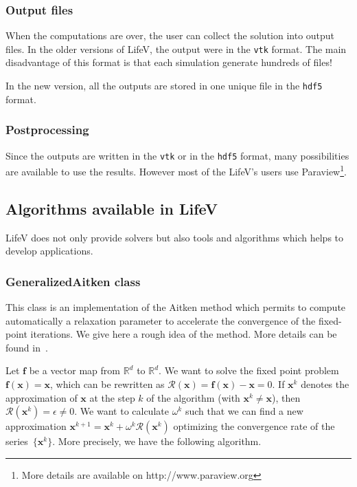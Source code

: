 \documentclass[11pt]{article}
\begin{document}
\subsubsection{Output files}
When the computations are over, the user can collect the solution into output files. In the older versions of LifeV, the output were in the \texttt{vtk} format. The main disadvantage of this format is that each simulation generate hundreds of files!

In the new version, all the outputs are stored in one unique file in the \texttt{hdf5} format.

\subsubsection{Postprocessing}
Since the outputs are written in the \texttt{vtk} or in the \texttt{hdf5} format, many possibilities are available to use the results. However most of the LifeV's users use Paraview\footnote{More details are available on http://www.paraview.org}.

\subsection{Algorithms available in LifeV}
LifeV does not only provide solvers but also tools and algorithms which helps to develop applications.

\subsubsection{GeneralizedAitken class}
\label{sec:aitken}
This class is an implementation of the Aitken method which permits to compute automatically a relaxation parameter to accelerate the convergence of the fixed-point iterations. We give here a rough idea of the method. More details can be found in~\cite{deparis}.

Let $\mathbf{f}$ be a vector map from $\mathbb{R}^d$ to $\mathbb{R}^d$. We want to solve the fixed point problem $\mathbf{f}(\mathbf{x})=\mathbf{x}$, which can be rewritten as $\mathcal{R}(\mathbf{x})=\mathbf{f}(\mathbf{x})-\mathbf{x} = 0$. If $\mathbf{x}^k$ denotes the approximation of $\mathbf{x}$ at the step $k$ of the algorithm (with $\mathbf{x}^k\neq\mathbf{x}$), then $\mathcal{R}(\mathbf{x}^k)=\epsilon\neq0$. We want to calculate $\omega^k$ such that we can find a new approximation $\mathbf{x}^{k+1}=\mathbf{x}^k+\omega^k\mathcal{R}(\mathbf{x}^k)$ optimizing the convergence rate of the series~$\{\mathbf{x}^k\}$. More precisely, we have the following algorithm.
\end{document}
